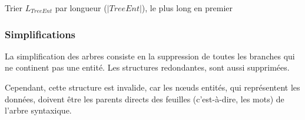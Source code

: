 \begin{algorithm}[H]
	\caption{$\textsf{ins\_ent\_list}(T = (D, t), L_{TreeEnt}, L_{Rels})$}
    
    Trier $L_{TreeEnt}$ par longueur ($|TreeEnt|$), le plus long en premier\;
    
    

    
\end{algorithm}

\subsubsection{Simplifications}

La simplification des arbres consiste en la suppression de toutes les branches qui ne continent pas une entité.
Les structures redondantes, sont aussi supprimées.


Cependant, cette structure est invalide, car les nœuds entités, qui représentent les données, doivent être les parents directs des feuilles (c'est-à-dire, les mots) de l'arbre syntaxique.

